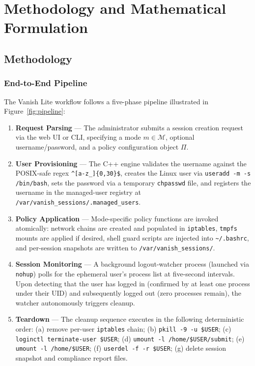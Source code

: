 \chapter{Methodology and Mathematical Formulation}

\section{Methodology}
\label{sec:methodology}

\subsection{End-to-End Pipeline}

The Vanish Lite workflow follows a five-phase pipeline illustrated in Figure~\ref{fig:pipeline}:

\begin{enumerate}[label=\textbf{Phase \arabic*:}, leftmargin=5em]
    \item \textbf{Request Parsing} — The administrator submits a session creation request via the web UI or CLI, specifying a mode $m \in \mathcal{M}$, optional username/password, and a policy configuration object $\Pi$.
    \item \textbf{User Provisioning} — The C++ engine validates the username against the POSIX-safe regex \texttt{\textasciicircum[a-z\_]\allowbreak[a-z0-9\_\text{-}]\allowbreak\{0,30\}\$}, creates the Linux user via \texttt{useradd -m -s /bin/bash}, sets the password via a temporary \texttt{chpasswd} file, and registers the username in the managed-user registry at \texttt{/var/\allowbreak vanish\_sessions/\allowbreak .managed\_users}.
    \item \textbf{Policy Application} — Mode-specific policy functions are invoked atomically: network chains are created and populated in \texttt{iptables}, \texttt{tmpfs} mounts are applied if desired, shell guard scripts are injected into \texttt{\textasciitilde/.bashrc}, and per-session snapshots are written to \texttt{/var/vanish\_sessions/}.
    \item \textbf{Session Monitoring} — A background logout-watcher process (launched via \texttt{nohup}) polls for the ephemeral user's process list at five-second intervals. Upon detecting that the user has logged in (confirmed by at least one process under their UID) and subsequently logged out (zero processes remain), the watcher autonomously triggers cleanup.
    \item \textbf{Teardown} — The cleanup sequence executes in the following deterministic order: (a) remove per-user \texttt{iptables} chain; (b) \texttt{pkill -9 -u \$USER}; (c) \texttt{loginctl terminate-user \$USER}; (d) \texttt{umount -l /home/\$USER/submit}; (e) \texttt{umount -l /home/\$USER}; (f) \texttt{userdel -f -r \$USER}; (g) delete session snapshot and compliance report files.
\end{enumerate}

